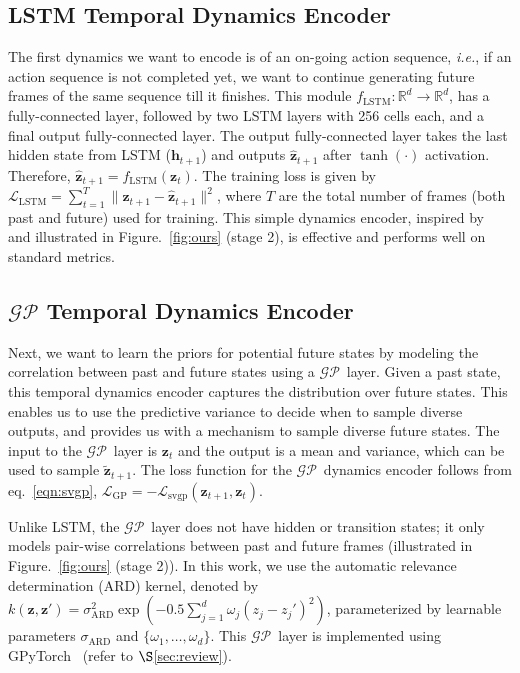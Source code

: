 \documentclass{article} \usepackage{iclr2021_conference,times}
\newcommand{\GP}{$\mathcal{GP}$}
\def\ie{\emph{i.e.}}
\newcommand{\bz}{\mathbf{z}}
\begin{document}
\subsection{LSTM Temporal Dynamics Encoder}
\vspace{-0.05in}
The first dynamics we want to encode is of an on-going action sequence, \ie, if an action sequence is not completed yet, we want to continue generating future frames of the same sequence till it finishes. This module $f_\text{LSTM}: \mathbb{R}^d \rightarrow \mathbb{R}^d$, has a fully-connected layer, followed by two LSTM layers with 256 cells each, and a final output fully-connected layer. The output fully-connected layer takes the last hidden state from LSTM ($\mathbf{h}_{t+1}$) and outputs $\hat{\mathbf{z}}_{t+1}$ after $\tanh(\cdot)$ activation. Therefore, $\hat{\bz}_{t+1} = f_\text{LSTM}(\mathbf{z}_{t})$. The training loss is given by $\mathcal{L}_\text{LSTM} =  \sum_{t=1}^{T}\|\mathbf{z}_{t+1} - \hat{\mathbf{z}}_{t+1}\|^2$, 
where $T$ are the total number of frames (both past and future) used for training. This simple dynamics encoder, inspired by~\citep{Srivastava:2015:ULV:3045118.3045209} and illustrated in Figure.~\ref{fig:ours} (stage 2), is effective and performs well on standard metrics. 

\vspace{-0.05in}
\subsection{$\mathcal{GP}$ Temporal Dynamics Encoder} 
\vspace{-0.05in}
Next, we want to learn the priors for potential future states by modeling the correlation between past and future states using a \GP\ layer. Given a past state, this temporal dynamics encoder captures the distribution over future states. This enables us to use the predictive variance to decide when to sample diverse outputs, and  provides us with a mechanism to sample diverse future states. The input to the \GP\ layer is $\bz_t$ and the output is a mean and variance, which can be used to sample $\tilde{\bz}_{t+1}$. The loss function for the \GP\ dynamics encoder follows from eq.~\ref{eqn:svgp}, $\mathcal{L}_{\text{GP}} = -\mathcal{L}_\text{svgp}(\mathbf{z}_{t+1},\mathbf{z}_{t})$. 


Unlike LSTM, the \GP\ layer does not have hidden or transition states; it only models pair-wise correlations between past and future frames (illustrated in Figure.~\ref{fig:ours} (stage 2)). In this work, we use the automatic relevance determination (ARD) kernel, denoted by
$k(\mathbf{z},\mathbf{z}') = \sigma_\text{ARD}^2 \exp \left( -0.5\sum_{j =1}^{d}\omega_j(z_j - z_j')^2\right)$,
parameterized by learnable parameters $\sigma_\text{ARD}$ and $\{\omega_1,\dots,\omega_d\}$. This \GP\ layer is implemented using GPyTorch~\citep{gardner2018gpytorch} (refer to $\S$\ref{sec:review}).
\end{document}

